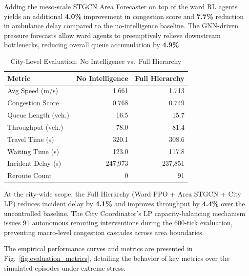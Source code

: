 \documentclass[conference]{IEEEtran}
\begin{document}
Adding the meso-scale STGCN Area Forecaster on top of the ward RL agents yields an additional \textbf{4.0\%} improvement in congestion score and \textbf{7.7\%} reduction in ambulance delay compared to the no-intelligence baseline. The GNN-driven pressure forecasts allow ward agents to preemptively relieve downstream bottlenecks, reducing overall queue accumulation by \textbf{4.9\%}.

\begin{table}[h]
\centering
\caption{City-Level Evaluation: No Intelligence vs.\ Full Hierarchy}
\label{tab:city_results}
\begin{tabular}{@{}lrr@{}}
\toprule
\textbf{Metric} & \textbf{No Intelligence} & \textbf{Full Hierarchy} \\ \midrule
Avg Speed (m/s)        & 1.661 & 1.713 \\
Congestion Score       & 0.768 & 0.749 \\
Queue Length (veh.)    & 16.5  & 15.7  \\
Throughput (veh.)      & 78.0  & 81.4  \\
Travel Time (s)        & 320.1 & 308.6 \\
Waiting Time (s)       & 123.0 & 117.8 \\
Incident Delay (s)     & 247{,}973 & 237{,}851 \\
Reroute Count          & 0     & 91    \\
\bottomrule
\end{tabular}
\end{table}

At the city-wide scope, the Full Hierarchy (Ward PPO + Area STGCN + City LP) reduces incident delay by \textbf{4.1\%} and improves throughput by \textbf{4.4\%} over the uncontrolled baseline. The City Coordinator's LP capacity-balancing mechanism issues 91 autonomous rerouting interventions during the 600-tick evaluation, preventing macro-level congestion cascades across area boundaries.

The empirical performance curves and metrics are presented in Fig.\ \ref{fig:evaluation_metrics}, detailing the behavior of key metrics over the simulated episodes under extreme stress.
\end{document}
